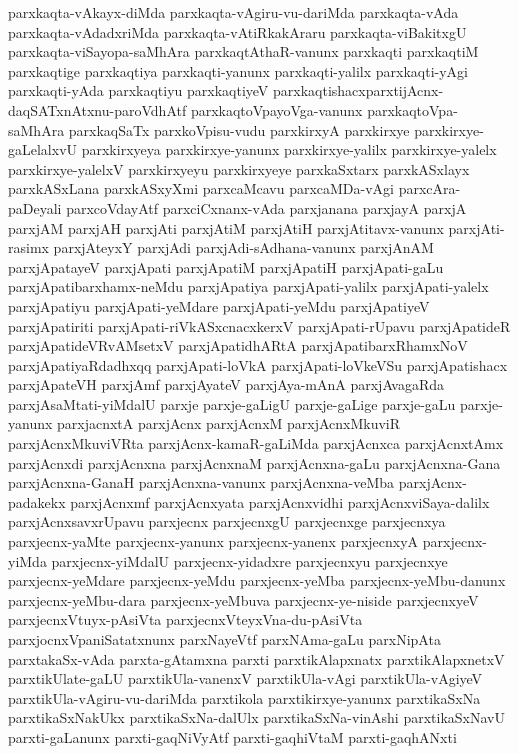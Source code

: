 {parxkaqta-vAkayx-diMda
parxkaqta-vAgiru-vu-dariMda
parxkaqta-vAda
parxkaqta-vAdadxriMda
parxkaqta-vAtiRkakAraru
parxkaqta-viBakitxgU
parxkaqta-viSayopa-saMhAra
parxkaqtAthaR-vanunx
parxkaqti
parxkaqtiM
parxkaqtige
parxkaqtiya
parxkaqti-yanunx
parxkaqti-yalilx
parxkaqti-yAgi
parxkaqti-yAda
parxkaqtiyu
parxkaqtiyeV
parxkaqtishacxparxtijAcnx-daqSATxnAtxnu-paroVdhAtf
parxkaqtoVpayoVga-vanunx
parxkaqtoVpa-saMhAra
parxkaqSaTx
parxkoVpisu-vudu
parxkirxyA
parxkirxye
parxkirxye-gaLelalxvU
parxkirxyeya
parxkirxye-yanunx
parxkirxye-yalilx
parxkirxye-yalelx
parxkirxye-yalelxV
parxkirxyeyu
parxkirxyeye
parxkaSxtarx
parxkASxlayx
parxkASxLana
parxkASxyXmi
parxcaMcavu
parxcaMDa-vAgi
parxcAra-paDeyali
parxcoVdayAtf
parxciCxnanx-vAda
parxjanana
parxjayA
parxjA
parxjAM
parxjAH
parxjAti
parxjAtiM
parxjAtiH
parxjAtitavx-vanunx
parxjAti-rasimx
parxjAteyxY
parxjAdi
parxjAdi-sAdhana-vanunx
parxjAnAM
parxjApatayeV
parxjApati
parxjApatiM
parxjApatiH
parxjApati-gaLu
parxjApatibarxhamx-neMdu
parxjApatiya
parxjApati-yalilx
parxjApati-yalelx
parxjApatiyu
parxjApati-yeMdare
parxjApati-yeMdu
parxjApatiyeV
parxjApatiriti
parxjApati-riVkASxcnacxkerxV
parxjApati-rUpavu
parxjApatideR
parxjApatideVRvAMsetxV
parxjApatidhARtA
parxjApatibarxRhamxNoV
parxjApatiyaRdadhxqq
parxjApati-loVkA
parxjApati-loVkeVSu
parxjApatishacx
parxjApateVH
parxjAmf
parxjAyateV
parxjAya-mAnA
parxjAvagaRda
parxjAsaMtati-yiMdalU
parxje
parxje-gaLigU
parxje-gaLige
parxje-gaLu
parxje-yanunx
parxjacnxtA
parxjAcnx
parxjAcnxM
parxjAcnxMkuviR
parxjAcnxMkuviVRta
parxjAcnx-kamaR-gaLiMda
parxjAcnxca
parxjAcnxtAmx
parxjAcnxdi
parxjAcnxna
parxjAcnxnaM
parxjAcnxna-gaLu
parxjAcnxna-Gana
parxjAcnxna-GanaH
parxjAcnxna-vanunx
parxjAcnxna-veMba
parxjAcnx-padakekx
parxjAcnxmf
parxjAcnxyata
parxjAcnxvidhi
parxjAcnxviSaya-dalilx
parxjAcnxsavxrUpavu
parxjecnx
parxjecnxgU
parxjecnxge
parxjecnxya
parxjecnx-yaMte
parxjecnx-yanunx
parxjecnx-yanenx
parxjecnxyA
parxjecnx-yiMda
parxjecnx-yiMdalU
parxjecnx-yidadxre
parxjecnxyu
parxjecnxye
parxjecnx-yeMdare
parxjecnx-yeMdu
parxjecnx-yeMba
parxjecnx-yeMbu-danunx
parxjecnx-yeMbu-dara
parxjecnx-yeMbuva
parxjecnx-ye-niside
parxjecnxyeV
parxjecnxVtuyx-pAsiVta
parxjecnxVteyxVna-du-pAsiVta
parxjocnxVpaniSatatxnunx
parxNayeVtf
parxNAma-gaLu
parxNipAta
parxtakaSx-vAda
parxta-gAtamxna
parxti
parxtikAlapxnatx
parxtikAlapxnetxV
parxtikUlate-gaLU
parxtikUla-vanenxV
parxtikUla-vAgi
parxtikUla-vAgiyeV
parxtikUla-vAgiru-vu-dariMda
parxtikola
parxtikirxye-yanunx
parxtikaSxNa
parxtikaSxNakUkx
parxtikaSxNa-dalUlx
parxtikaSxNa-vinAshi
parxtikaSxNavU
parxti-gaLanunx
parxti-gaqNiVyAtf
parxti-gaqhiVtaM
parxti-gaqhANxti
}
